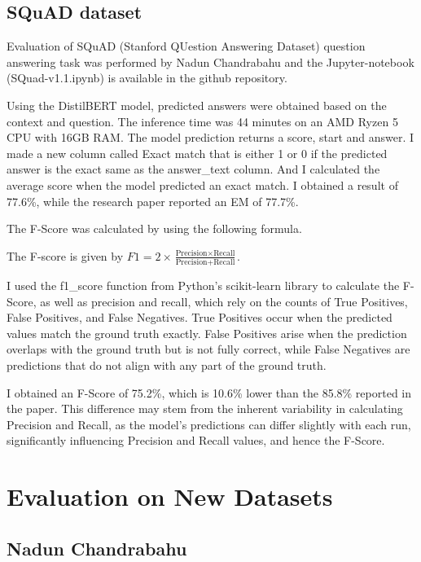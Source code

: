 \documentclass[
  11pt,
]{article}
\begin{document}
\hypertarget{squad-dataset-1}{%
\subsection{SQuAD dataset}\label{squad-dataset-1}}

Evaluation of SQuAD (Stanford QUestion Answering Dataset) question
answering task was performed by Nadun Chandrabahu and the
Jupyter-notebook (SQuad-v1.1.ipynb) is available in the github
repository.

Using the DistilBERT model, predicted answers were obtained based on the
context and question. The inference time was 44 minutes on an AMD Ryzen
5 CPU with 16GB RAM. The model prediction returns a score, start and
answer. I made a new column called Exact match that is either 1 or 0 if
the predicted answer is the exact same as the answer\_text column. And I
calculated the average score when the model predicted an exact match. I
obtained a result of 77.6\%, while the research paper reported an EM of
77.7\%.

The F-Score was calculated by using the following formula.

The F-score is given by
\(F1 = 2 \times \frac{\text{Precision} \times \text{Recall}}{\text{Precision} + \text{Recall}}\).

I used the f1\_score function from Python's scikit-learn library to
calculate the F-Score, as well as precision and recall, which rely on
the counts of True Positives, False Positives, and False Negatives. True
Positives occur when the predicted values match the ground truth
exactly. False Positives arise when the prediction overlaps with the
ground truth but is not fully correct, while False Negatives are
predictions that do not align with any part of the ground truth.

I obtained an F-Score of 75.2\%, which is 10.6\% lower than the 85.8\%
reported in the paper. This difference may stem from the inherent
variability in calculating Precision and Recall, as the model's
predictions can differ slightly with each run, significantly influencing
Precision and Recall values, and hence the F-Score.

\hypertarget{evaluation-on-new-datasets}{%
\section{Evaluation on New Datasets}\label{evaluation-on-new-datasets}}

\hypertarget{nadun-chandrabahu}{%
\subsection{Nadun Chandrabahu}\label{nadun-chandrabahu}}
\end{document}
